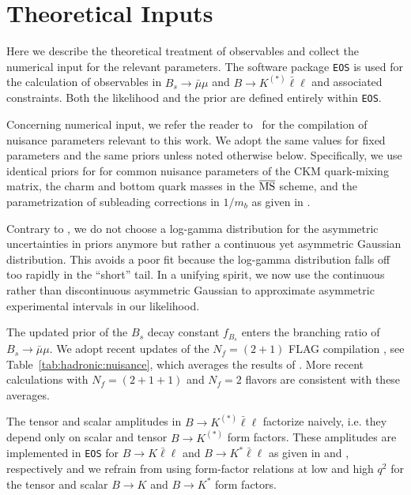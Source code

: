 \documentclass[twocolumn,epjc3]{svjour3}
\numberwithin{equation}{section}
\def \reftab#1{Table~\ref{#1}}
\newcommand{\checked}[1]{{\color{brown}{ {\bf Checked: }{#1}}}}
\renewcommand{\checked}[1]{#1}
\renewcommand{\[}{\big[}
\renewcommand{\]}{\big]}
\renewcommand{\(}{\big(}
\renewcommand{\)}{\big)}
\def \eos{\texttt{EOS}}
\begin{document}
%
%
%
\section{
  \checked{Theoretical Inputs}
  \label{app:theory:inputs}
}

Here we describe the theoretical treatment of observables and collect the
numerical input for the relevant parameters. The software package \eos{}
\cite{Bobeth:2011gi, Bobeth:2011nj, EOS} is used for the calculation of
observables in $B_s\to \bar\mu\mu$ and $B\to K^{(*)}\bar\ell\ell$ and associated
constraints. Both the likelihood and the prior are defined entirely within \eos.

Concerning numerical input, we refer the reader to~\cite{Beaujean:2013soa} for
the compilation of nuisance parameters relevant to this work. We adopt the same
values for fixed parameters and the same priors unless noted otherwise
below. Specifically, we use identical priors for for common nuisance parameters
of the CKM quark-mixing matrix, the charm and bottom quark masses in the
$\overline{\rm MS}$ scheme, and the parametrization of subleading corrections
in $1/m_b$ as given in \cite{Beaujean:2013soa}.

Contrary to \cite{Beaujean:2013soa}, we do not choose a log-gamma
distribution for the asymmetric uncertainties in priors anymore but
rather a continuous yet asymmetric Gaussian distribution. This avoids
a poor fit because the log-gamma distribution falls off too rapidly in
the ``short'' tail. In a unifying spirit, we now use the continuous rather
than discontinuous asymmetric Gaussian to approximate asymmetric
experimental intervals in our likelihood.

The updated prior of the $B_s$ decay constant $f_{B_s}$ enters the branching
ratio of $B_s\to \bar\mu\mu$. We adopt recent updates of the $N_f = (2 + 1)$
FLAG compilation \cite{Aoki:2013ldr}, see \reftab{tab:hadronic:nuisance}, which
averages the results of \cite{Bazavov:2011aa, McNeile:2011ng, Na:2012kp}.  More
recent calculations with $N_f = (2+1+1)$ \cite{Dowdall:2013tga} and $N_f = 2$
\cite{Carrasco:2013zta} flavors are consistent with these averages.

The tensor and scalar amplitudes in $B\to K^{(*)} \bar\ell\ell$ factorize
naively, i.e. they depend only on scalar and tensor $B\to K^{(*)}$ form
factors. These amplitudes are implemented in \eos{} for $B\to K \bar\ell\ell$
and $B\to K^* \bar\ell\ell$ as given in \cite{Bobeth:2007dw} and
\cite{Bobeth:2012vn}, respectively and we refrain from using form-factor
relations at {low and high $q^2$} for the tensor and scalar $B\to K$ and $B\to
K^*$ form factors.
\end{document}
